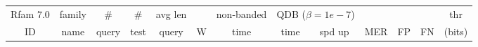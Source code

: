 %
%
%
%

\renewcommand{\baselinestretch}{1.0}
\begin{table}
\scriptsize
\begin{center}
\begin{tabular}{|ll|rr|rr|r|rr|rrrr|} \hline
\multicolumn{1}{|c}{Rfam 7.0} & \multicolumn{1}{c|}{family} &
\multicolumn{1}{c}{\#} & \multicolumn{1}{c|}{\#} &
\multicolumn{1}{c}{avg len} & \multicolumn{1}{c|}{} &
\multicolumn{1}{c}{non-banded} & \multicolumn{2}{|c|}{QDB
    ($\beta=1e-7$)} &  \multicolumn{3}{|c}{} & \multicolumn{1}{c|}{thr} \\ 
\multicolumn{1}{|c}{ID} & \multicolumn{1}{c|}{name} &
\multicolumn{1}{c}{query} & \multicolumn{1}{c|}{test} &
\multicolumn{1}{c}{query} & \multicolumn{1}{c|}{W} &
\multicolumn{1}{|c|}{time} & \multicolumn{1}{|c}{time} &
    \multicolumn{1}{c|}{spd up} & \multicolumn{1}{c}{MER} &
      \multicolumn{1}{c}{FP} & \multicolumn{1}{c}{FN} &
      \multicolumn{1}{c|}{(bits)} \\ \hline 


\end{tabular}
\end{center}
\end{table}
